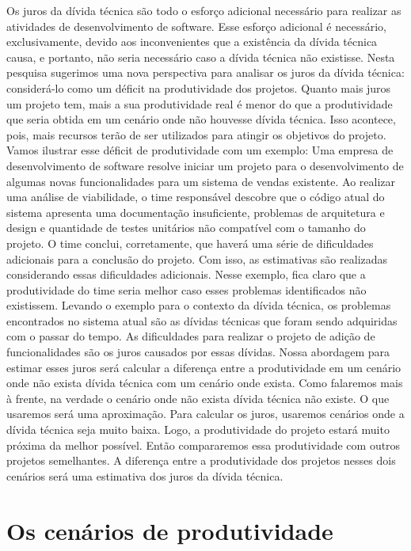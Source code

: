 Os juros da dívida técnica são todo o esforço adicional necessário para realizar as atividades de desenvolvimento de software. Esse esforço adicional é necessário, exclusivamente, devido aos inconvenientes que a existência da dívida técnica causa, e portanto, não seria necessário caso a dívida técnica não existisse. Nesta pesquisa sugerimos uma nova perspectiva para analisar os juros da dívida técnica: considerá-lo como um déficit na produtividade dos projetos. Quanto mais juros um projeto tem, mais a sua produtividade real é menor do que a produtividade que seria obtida em um cenário onde não houvesse dívida técnica. Isso acontece, pois, mais recursos terão de ser utilizados para atingir os objetivos do projeto.  Vamos ilustrar esse déficit de produtividade com um exemplo: Uma empresa de desenvolvimento de software resolve iniciar um projeto para o desenvolvimento de algumas novas funcionalidades para um sistema de vendas existente. Ao realizar uma análise de viabilidade, o time responsável descobre que o código atual do sistema apresenta uma documentação insuficiente, problemas de arquitetura e design e quantidade de testes unitários não compatível com o tamanho do projeto. O time conclui, corretamente, que haverá uma série de dificuldades adicionais para a conclusão do projeto. Com isso, as estimativas são realizadas considerando essas dificuldades adicionais. Nesse exemplo, fica claro que a produtividade do time seria melhor caso esses problemas identificados não existissem. Levando o exemplo para o contexto da dívida técnica, os problemas encontrados no sistema atual são as dívidas técnicas que foram sendo adquiridas com o passar do tempo. As dificuldades para realizar o projeto de adição de funcionalidades são os juros causados por essas dívidas. Nossa abordagem para estimar esses juros será calcular a diferença entre a produtividade em um cenário onde não exista dívida técnica com um cenário onde exista. Como falaremos mais à frente, na verdade o cenário onde não exista dívida técnica não existe. O que usaremos será uma aproximação. Para calcular os juros, usaremos cenários onde a dívida técnica seja muito baixa. Logo, a produtividade do projeto estará muito próxima da melhor possível. Então compararemos essa produtividade com outros projetos semelhantes. A diferença entre a produtividade dos projetos nesses dois cenários será uma estimativa dos juros da dívida técnica.


\section{Os cenários de produtividade}


